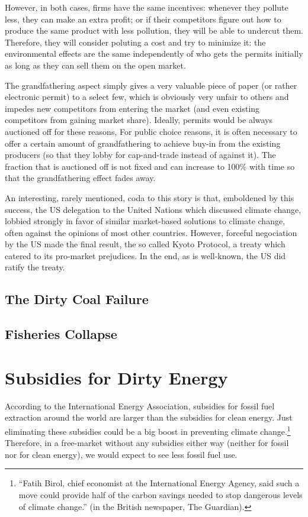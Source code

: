 However, in both cases, firms have the same incentives: whenever they pollute
less, they can make an extra profit; or if their competitors figure out how to
produce the same product with less pollution, they will be able to undercut
them. Therefore, they will consider poluting a cost and try to minimize it: the
environmental effects are the same independently of who gets the permits
initially as long as they can sell them on the open market.

The grandfathering aspect simply gives a very valuable piece of paper (or
rather electronic permit) to a select few, which is obviously very unfair to
others and impedes new competitors from entering the market (and even existing
competitors from gaining market share). Ideally, permits would be always
auctioned off for these reasons, For public choice reasons, it is often
necessary to offer a certain amount of grandfathering to achieve buy-in from
the existing producers (so that they lobby for cap-and-trade instead of against
it). The fraction that is auctioned off is not fixed and can increase to 100\%
with time so that the grandfathering effect fades away.

An interesting, rarely mentioned, coda to this story is that, emboldened by
this success, the US delegation to the United Nations which discussed climate
change, lobbied strongly in favor of similar market-based solutions to climate
change, often against the opinions of most other countries. However, forceful
negociation by the US made the final result, the so called Kyoto Protocol, a
treaty which catered to its pro-market prejudices. In the end, as is
well-known, the US did ratify the treaty.

\subsection{The Dirty Coal Failure}

\subsection{Fisheries Collapse}

\section{Subsidies for Dirty Energy}

According to the International Energy Association, subsidies for fossil fuel
extraction around the world are larger than the subsidies for clean energy.
Just eliminating these subsidies could be a big boost in preventing climate
change.\footnote{``Fatih Birol, chief
economist at the International Energy Agency, said such a move could
provide half of the carbon savings needed to stop dangerous levels of climate
change.'' (in the British newspaper, The Guardian).%
} Therefore, in a free-market without any subsidies either way (neither for
fossil nor for clean energy), we would expect to see less fossil fuel use.

